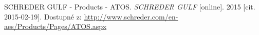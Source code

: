 \begin{thebibliography}{1}

SCHREDER GULF - Products - ATOS. \textit{SCHREDER GULF} [online]. 2015 [cit. 2015-02-19]. Dostupné z: \url{http://www.schreder.com/en-aes/Products/Pages/ATOS.aspx}

\end{thebibliography}